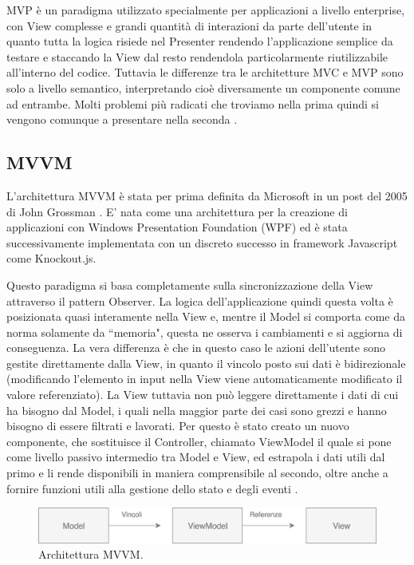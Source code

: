 \noindent
MVP è un paradigma utilizzato specialmente per applicazioni a livello enterprise, con View complesse e grandi quantità di interazioni da parte dell'utente in quanto tutta la logica risiede nel Presenter rendendo l'applicazione semplice da testare e staccando la View dal resto rendendola particolarmente riutilizzabile all'interno del codice.
Tuttavia le differenze tra le architetture MVC e MVP sono solo a livello semantico, interpretando cioè diversamente un componente comune ad entrambe. Molti problemi più radicati che troviamo nella prima quindi si vengono comunque a presentare nella seconda \cite{OsmaniOnJSFrameworks}.

\subsection{MVVM}
L'architettura MVVM è stata per prima definita da Microsoft in un post del 2005 di John Grossman \cite{GossmanOnMVVM}. E' nata come una architettura per la creazione di applicazioni con Windows Presentation Foundation (WPF) ed è stata successivamente implementata con un discreto successo in framework Javascript come Knockout.js.

Questo paradigma si basa completamente sulla sincronizzazione della View attraverso il pattern Observer. La logica dell'applicazione quindi questa volta è posizionata quasi interamente nella View e, mentre il Model si comporta come da norma solamente da “memoria", questa ne osserva i cambiamenti e si aggiorna di conseguenza. La vera differenza è che in questo caso le azioni dell'utente sono gestite direttamente dalla View, in quanto il vincolo posto sui dati è bidirezionale (modificando l'elemento in input nella View viene automaticamente modificato il valore referenziato).
La View tuttavia non può leggere direttamente i dati di cui ha bisogno dal Model, i quali nella maggior parte dei casi sono grezzi e hanno bisogno di essere filtrati e lavorati. Per questo è stato creato un nuovo componente, che sostituisce il Controller, chiamato ViewModel il quale si pone come livello passivo intermedio tra Model e View, ed estrapola i dati utili dal primo e li rende disponibili in maniera comprensibile al secondo, oltre anche a fornire funzioni utili alla gestione dello stato e degli eventi \cite{OsmaniOnJSFrameworks}.

\begin{figure}[h]
\centering 
\vspace*{0.5cm}
\includegraphics[width=13cm]{./images/MVVMworkflow}
\caption{Architettura MVVM.}
\vspace*{0.5cm} 
\end{figure}

